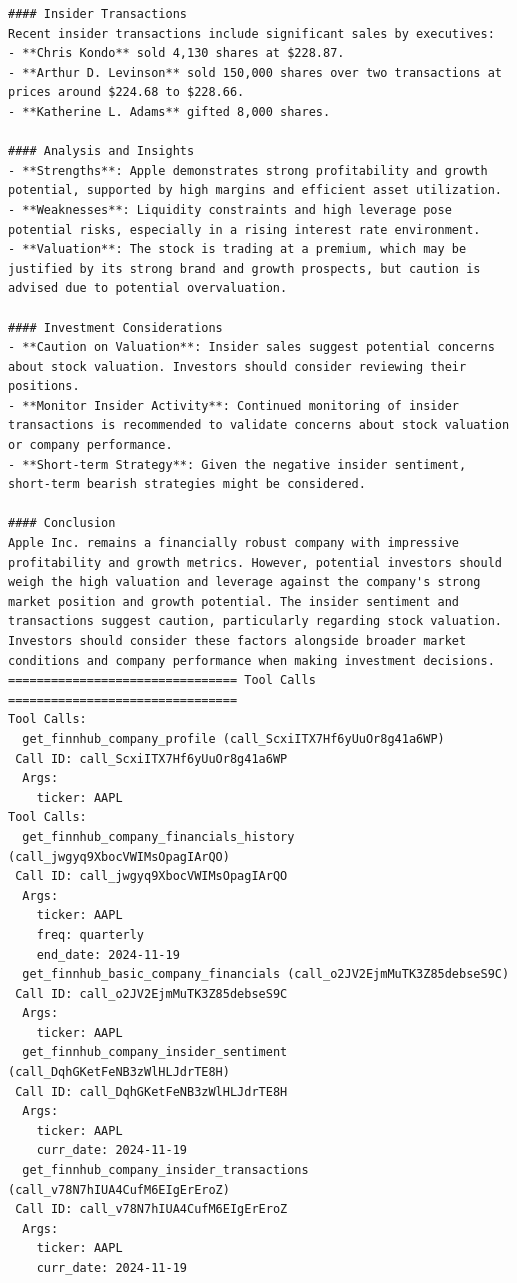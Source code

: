 \begin{tcolorbox}
\begin{lstlisting}[style=agentbase]
#### Insider Transactions
Recent insider transactions include significant sales by executives:
- **Chris Kondo** sold 4,130 shares at $228.87.
- **Arthur D. Levinson** sold 150,000 shares over two transactions at prices around $224.68 to $228.66.
- **Katherine L. Adams** gifted 8,000 shares.

#### Analysis and Insights
- **Strengths**: Apple demonstrates strong profitability and growth potential, supported by high margins and efficient asset utilization.
- **Weaknesses**: Liquidity constraints and high leverage pose potential risks, especially in a rising interest rate environment.
- **Valuation**: The stock is trading at a premium, which may be justified by its strong brand and growth prospects, but caution is advised due to potential overvaluation.

#### Investment Considerations
- **Caution on Valuation**: Insider sales suggest potential concerns about stock valuation. Investors should consider reviewing their positions.
- **Monitor Insider Activity**: Continued monitoring of insider transactions is recommended to validate concerns about stock valuation or company performance.
- **Short-term Strategy**: Given the negative insider sentiment, short-term bearish strategies might be considered.

#### Conclusion
Apple Inc. remains a financially robust company with impressive profitability and growth metrics. However, potential investors should weigh the high valuation and leverage against the company's strong market position and growth potential. The insider sentiment and transactions suggest caution, particularly regarding stock valuation. Investors should consider these factors alongside broader market conditions and company performance when making investment decisions.
================================ Tool Calls ================================
Tool Calls:
  get_finnhub_company_profile (call_ScxiITX7Hf6yUuOr8g41a6WP)
 Call ID: call_ScxiITX7Hf6yUuOr8g41a6WP
  Args:
    ticker: AAPL
Tool Calls:
  get_finnhub_company_financials_history (call_jwgyq9XbocVWIMsOpagIArQO)
 Call ID: call_jwgyq9XbocVWIMsOpagIArQO
  Args:
    ticker: AAPL
    freq: quarterly
    end_date: 2024-11-19
  get_finnhub_basic_company_financials (call_o2JV2EjmMuTK3Z85debseS9C)
 Call ID: call_o2JV2EjmMuTK3Z85debseS9C
  Args:
    ticker: AAPL
  get_finnhub_company_insider_sentiment (call_DqhGKetFeNB3zWlHLJdrTE8H)
 Call ID: call_DqhGKetFeNB3zWlHLJdrTE8H
  Args:
    ticker: AAPL
    curr_date: 2024-11-19
  get_finnhub_company_insider_transactions (call_v78N7hIUA4CufM6EIgErEroZ)
 Call ID: call_v78N7hIUA4CufM6EIgErEroZ
  Args:
    ticker: AAPL
    curr_date: 2024-11-19
\end{lstlisting}
\end{tcolorbox}

